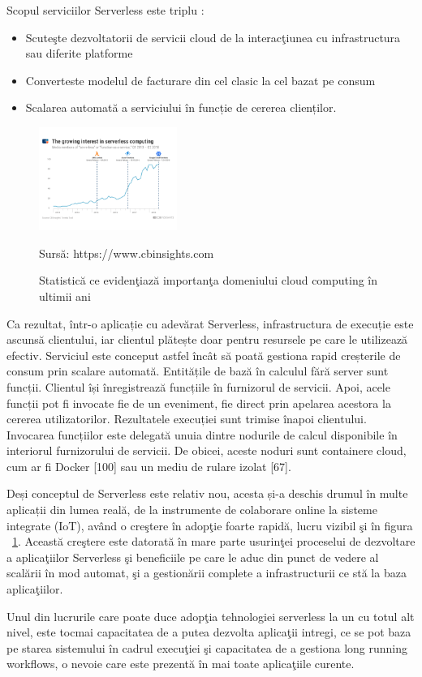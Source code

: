 \documentclass[a4paper,12pt]{report}
\newcommand{\source}[1]{\caption*{Sursă: {#1}} }
\begin{document}
Scopul serviciilor Serverless este triplu : 
\begin{itemize}
\item Scuteşte dezvoltatorii de servicii cloud de la interacţiunea cu infrastructura sau diferite platforme
\item Converteste modelul de facturare din cel clasic la cel bazat pe consum
\item Scalarea automată a serviciului în funcție de cererea clienților.
\end{itemize}
\par

\begin{figure}
	  \begin{center}
        \includegraphics[width=0.4\textwidth]{images/grafic_serverless_computing}
       \caption{Statistică ce evidenţiază importanţa domeniului cloud computing în ultimii ani}
			\label{fig:cloud_computing_graph}
       \source {https://www.cbinsights.com}
    \end{center}
\end{figure}
Ca rezultat, într-o aplicație cu adevărat Serverless, infrastructura de execuție este ascunsă clientului, iar clientul plătește doar pentru resursele pe care le utilizează efectiv. Serviciul este conceput astfel încât să poată gestiona rapid creșterile de consum prin scalare automată. Entitățile de bază în calculul fără server sunt funcții. Clientul își înregistrează funcțiile în furnizorul de servicii. Apoi, acele funcții pot fi invocate fie de un eveniment, fie direct prin apelarea acestora la cererea utilizatorilor. Rezultatele execuției sunt trimise înapoi clientului. Invocarea funcțiilor este delegată unuia dintre nodurile de calcul disponibile în interiorul furnizorului de servicii. De obicei, aceste noduri sunt containere cloud, cum ar fi Docker [100] sau un mediu de rulare izolat [67].

\par
Deși conceptul de Serverless este relativ nou, acesta și-a deschis drumul în multe aplicații din lumea reală, de la instrumente de colaborare online la sisteme integrate (IoT), având o creştere în adopţie foarte rapidă, lucru vizibil şi în figura ~\ref{fig:cloud_computing_graph}. Această creştere este datorată în mare parte usurinţei proceselui de dezvoltare a aplicaţiilor Serverless şi beneficiile pe care le aduc din punct de vedere al scalării în mod automat, şi a gestionării complete a infrastructurii ce stă la baza aplicaţiilor. 
\par
Unul din lucrurile care poate duce adopţia tehnologiei serverless la un cu totul alt nivel, este tocmai capacitatea de a putea dezvolta aplicaţii intregi, ce se pot baza pe starea sistemului în cadrul execuţiei şi capacitatea de a gestiona long running workflows, o nevoie care este prezentă în mai toate aplicaţiile curente. 
\end{document}
